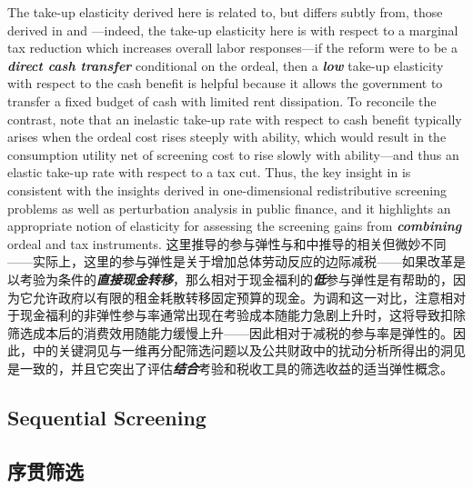 \documentclass[12pt,letterpaper]{article}
\newenvironment{original}{\color{black}\noindent}{}
\newenvironment{translation}{\color{blue}\noindent}{}
\theoremstyle{plain}
\theoremstyle{definition}
\theoremstyle{remark}
\renewcommand{\1}{\mathds{1}}
\theoremstyle{definition}
\begin{document}
\begin{original}
The take-up elasticity derived here is related to, but differs subtly from, those derived in \citet*{yang2023comparison} and \citet*{rafkin2023self}---indeed, the take-up elasticity here is with respect to a marginal tax reduction which increases overall labor responses---if the reform were to be a \textit{\textbf{direct cash transfer}} conditional on the ordeal, then a \textit{\textbf{low}} take-up elasticity with respect to the cash benefit is helpful because it allows the government to transfer a fixed budget of cash with limited rent dissipation. To reconcile the contrast, note that an inelastic take-up rate with respect to cash benefit typically arises when the ordeal cost rises steeply with ability, which would result in the consumption utility net of screening cost to rise slowly with ability---and thus an elastic take-up rate with respect to a tax cut. Thus, the key insight in  is consistent with the insights derived in one-dimensional redistributive screening problems as well as perturbation analysis in public finance, and it highlights an appropriate notion of elasticity for assessing the screening gains from \textit{\textbf{combining}} ordeal and tax instruments.
\end{original}
\begin{translation}
这里推导的参与弹性与\citet*{yang2023comparison}和\citet*{rafkin2023self}中推导的相关但微妙不同——实际上，这里的参与弹性是关于增加总体劳动反应的边际减税——如果改革是以考验为条件的\textit{\textbf{直接现金转移}}，那么相对于现金福利的\textit{\textbf{低}}参与弹性是有帮助的，因为它允许政府以有限的租金耗散转移固定预算的现金。为调和这一对比，注意相对于现金福利的非弹性参与率通常出现在考验成本随能力急剧上升时，这将导致扣除筛选成本后的消费效用随能力缓慢上升——因此相对于减税的参与率是弹性的。因此，中的关键洞见与一维再分配筛选问题以及公共财政中的扰动分析所得出的洞见是一致的，并且它突出了评估\textit{\textbf{结合}}考验和税收工具的筛选收益的适当弹性概念。
\end{translation}

\begin{original}
\subsection{Sequential Screening}
\end{original}
\begin{translation}
\subsection{序贯筛选}
\end{translation}
\end{document}
